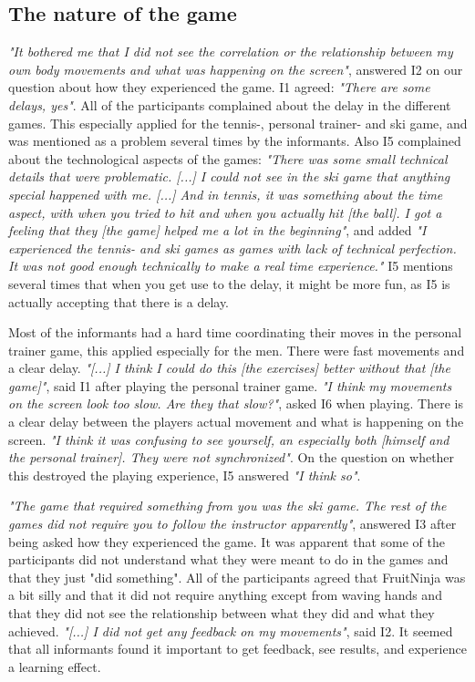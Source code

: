 \subsection{The nature of the game}
\emph{"It bothered me that I did not see the correlation or the relationship between my own body movements and what was happening on the screen"}, answered I2 on our question about how they experienced the game. I1 agreed: \emph{"There are some delays, yes"}. All of the participants complained about the delay in the different games. This especially applied for the tennis-, personal trainer- and ski game, and was mentioned as a problem several times by the informants. Also I5 complained about the technological aspects of the games: \emph{"There was some small technical details that were problematic. [...] I could not see in the ski game that anything special happened with me. [...] And in tennis, it was something about the time aspect, with when you tried to hit and when you actually hit [the ball]. I got a feeling that they [the game] helped me a lot in the beginning"}, and added \emph{"I experienced the tennis- and ski games as games with lack of technical perfection. It was not good enough technically to make a real time experience."}  I5 mentions several times that when you get use to the delay, it might be more fun, as I5 is actually accepting that there is a delay. 

Most of the informants had a hard time coordinating their moves in the personal trainer game, this applied especially for the men. There were fast movements and a clear delay. \emph{"[...] I think I could do this [the exercises] better without that [the game]"}, said I1 after playing the personal trainer game. \emph{"I think my movements on the screen look too slow. Are they that slow?"}, asked I6 when playing. There is a clear delay between the players actual movement and what is happening on the screen.  \emph{"I think it was confusing to see yourself, an especially both [himself and the personal trainer]. They were not synchronized"}. On the question on whether this destroyed the playing experience, I5 answered \emph{"I think so"}. 

\emph{"The game that required something from you was the ski game. The rest of the games did not require you to follow the instructor apparently"}, answered I3 after being asked how they experienced the game. It was apparent that some of the participants did not understand what they were meant to do in the games and that they just "did something". All of the participants agreed that FruitNinja was a bit silly and that it did not require anything except from waving hands and that they did not see the relationship between what they did and what they achieved. \emph{"[...] I did not get any feedback on my movements"}, said I2.  It seemed that all informants found it important to get feedback, see results, and experience a learning effect. 

